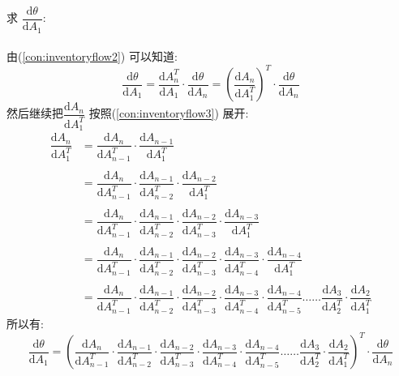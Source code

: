 \documentclass[withoutpreface,bwprint]{cumcmthesis} %
\begin{document}
	\par 求 $\dfrac{\mathrm{d} \theta}{\mathrm{d} A_{1}} $:
	\\\\由(\ref{con:inventoryflow2}) 可以知道:
	\begin{equation}
		\dfrac{\mathrm{d} \theta}{\mathrm{d} A_{1}}=\dfrac{\mathrm{d} A_{n}^{T}}{\mathrm{d} A_{1}} 
		\cdot
		\dfrac{\mathrm{d} \theta}{\mathrm{d} A_{n}}=(\dfrac{\mathrm{d} A_{n}}{\mathrm{d} A_{1}^{T}})^T
		\cdot
		\dfrac{\mathrm{d} \theta}{\mathrm{d} A_{n}}
	\end{equation}
	然后继续把$\dfrac{\mathrm{d} A_{n}}{\mathrm{d} A_{1}^{T}}$ 按照(\ref{con:inventoryflow3}) 展开:
	\begin{align*}
		\dfrac{\mathrm{d} A_{n}}{\mathrm{d} A_{1}^{T}}
		&=
		\dfrac{\mathrm{d} A_{n}}{\mathrm{d} A_{n-1}^{T}}
		\cdot
		\dfrac{\mathrm{d} A_{n-1}}{\mathrm{d} A_{1}^{T}}\\\\
		&=
		\dfrac{\mathrm{d} A_{n}}{\mathrm{d} A_{n-1}^{T}}
		\cdot
		\dfrac{\mathrm{d} A_{n-1}}{\mathrm{d} A_{n-2}^{T}}
		\cdot
		\dfrac{\mathrm{d} A_{n-2}}{\mathrm{d} A_{1}^{T}}\\\\
		&=
		\dfrac{\mathrm{d} A_{n}}{\mathrm{d} A_{n-1}^{T}}
		\cdot
		\dfrac{\mathrm{d} A_{n-1}}{\mathrm{d} A_{n-2}^{T}}
		\cdot
		\dfrac{\mathrm{d} A_{n-2}}{\mathrm{d} A_{n-3}^{T}}
		\cdot
		\dfrac{\mathrm{d} A_{n-3}}{\mathrm{d} A_{1}^{T}}\\\\
		&=
		\dfrac{\mathrm{d} A_{n}}{\mathrm{d} A_{n-1}^{T}}
		\cdot
		\dfrac{\mathrm{d} A_{n-1}}{\mathrm{d} A_{n-2}^{T}}
		\cdot
		\dfrac{\mathrm{d} A_{n-2}}{\mathrm{d} A_{n-3}^{T}}
		\cdot
		\dfrac{\mathrm{d} A_{n-3}}{\mathrm{d} A_{n-4}^{T}}
		\cdot
		\dfrac{\mathrm{d} A_{n-4}}{\mathrm{d} A_{1}^{T}}\\\\
		&=
		\dfrac{\mathrm{d} A_{n}}{\mathrm{d} A_{n-1}^{T}}
		\cdot
		\dfrac{\mathrm{d} A_{n-1}}{\mathrm{d} A_{n-2}^{T}}
		\cdot
		\dfrac{\mathrm{d} A_{n-2}}{\mathrm{d} A_{n-3}^{T}}
		\cdot
		\dfrac{\mathrm{d} A_{n-3}}{\mathrm{d} A_{n-4}^{T}}
		\cdot
		\dfrac{\mathrm{d} A_{n-4}}{\mathrm{d} A_{n-5}^{T}}
		\ldots \ldots
		\dfrac{\mathrm{d} A_{3}}{\mathrm{d} A_{2}^{T}}
		\cdot
		\dfrac{\mathrm{d} A_{2}}{\mathrm{d} A_{1}^{T}} 
	\end{align*}
	所以有:
	\begin{equation}
		\dfrac{\mathrm{d} \theta}{\mathrm{d} A_{1}}=(\dfrac{\mathrm{d} A_{n}}{\mathrm{d} A_{n-1}^{T}}
		\cdot
		\dfrac{\mathrm{d} A_{n-1}}{\mathrm{d} A_{n-2}^{T}}
		\cdot
		\dfrac{\mathrm{d} A_{n-2}}{\mathrm{d} A_{n-3}^{T}}
		\cdot
		\dfrac{\mathrm{d} A_{n-3}}{\mathrm{d} A_{n-4}^{T}}
		\cdot
		\dfrac{\mathrm{d} A_{n-4}}{\mathrm{d} A_{n-5}^{T}}
		\ldots \ldots
		\dfrac{\mathrm{d} A_{3}}{\mathrm{d} A_{2}^{T}}
		\cdot
		\dfrac{\mathrm{d} A_{2}}{\mathrm{d} A_{1}^{T}} )^T
		\cdot
		\dfrac{\mathrm{d} \theta}{\mathrm{d} A_{n}}
	\end{equation}
\end{document}
